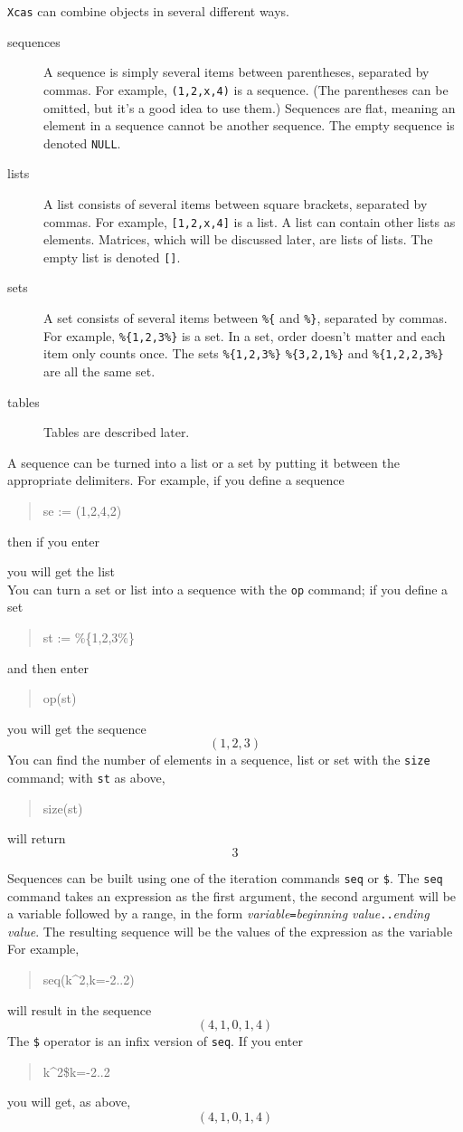 \documentclass{article}
\newcommand{\xcasin}[1]
{\begin{quote}\ttfamily
#1
\end{quote}}
\newcommand{\xcasout}[1]
{\begin{equation*}
#1
\end{equation*}}
\begin{document}
\texttt{Xcas} can combine objects in several different ways.
\begin{description}
  \item[sequences]
  A sequence is simply several items between parentheses, separated by
  commas.  For example, \texttt{(1,2,x,4)} is a sequence.
  (The parentheses can be omitted, but it's a good idea to use them.)    
  Sequences are flat, meaning an element in a sequence cannot be
  another sequence.
  The empty sequence is denoted \texttt{NULL}.
  \item[lists]
  A list consists of several items between square brackets,
  separated by commas.  For example, \texttt{[1,2,x,4]} is a
  list.  A list can contain other lists as elements.  Matrices, which
  will be discussed later, are lists of lists.  The empty list is
  denoted \texttt{[]}.
  \item[sets]
  A set consists of several items between \texttt{\%\{} and
  \texttt{\%\}}, separated by commas.  For example,
  \texttt{\%\{1,2,3\%\}} is a set.  In a set, order doesn't matter and
  each item only counts once.  The sets \texttt{\%\{1,2,3\%\}}
  \texttt{\%\{3,2,1\%\}} and \texttt{\%\{1,2,2,3\%\}} are all the same
  set.
  \item[tables]
  Tables are described later.
\end{description}
A sequence can be turned into a list or a set by putting it between
the appropriate delimiters.  For example, if you define a sequence
\xcasin{se := (1,2,4,2)}
then if you enter
\xcasin{[se]}
you will get the list
\xcasout{[1,2,4,2]}
You can turn a set or list into a sequence with the \texttt{op}
command; if you define a set
\xcasin{st := \%\{1,2,3\%\}}
and then enter
\xcasin{op(st)}
you will get the sequence
\xcasout{(1,2,3)}
You can find the number of elements in a sequence, list or set with
the \texttt{size} command; with \texttt{st} as above,
\xcasin{size(st)}
will return
\xcasout{3}

Sequences can be built using one of the iteration commands
\texttt{seq} or \texttt{\$}.  The \texttt{seq} command takes an
expression as the first argument, the second argument will be a
variable followed by a range, in the form
\textit{variable}\texttt{=}\textit{beginning
value}\texttt{..}\textit{ending value}.  The resulting sequence will be
the values of the expression as the variable For example,
\xcasin{seq(k\^{}2,k=-2..2)}
will result in the sequence
\xcasout{(4,1,0,1,4)}
The \texttt{\$} operator is an infix version of \texttt{seq}.  If you
enter
\xcasin{k\^{}2\$k=-2..2}
you will get, as above,
\xcasout{(4,1,0,1,4)}
\end{document}
